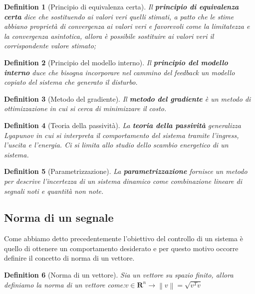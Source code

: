 \documentclass{book}
\newcommand{\norm}[1]{\left\lVert#1\right\rVert}
\newtheorem{definition}{Definition}[section]
\begin{document}
\begin{definition}[Principio di equivalenza certa]
Il \textbf{principio di equivalenza certa} dice che sostituendo ai valori veri quelli stimati, a patto che le stime abbiano proprietà di convergenza ai valori veri e favorevoli come la limitatezza e la convergenza asintotica, allora è possibile sostituire ai valori veri il corrispondente valore stimato;
\end{definition}
\begin{definition}[Principio del modello interno]
Il \textbf{principio del modello interno} duce che bisogna incorporare nel cammino del feedback un modello copiato del sistema che generato il disturbo.
\end{definition}
\begin{definition}[Metodo del gradiente]
Il \textbf{metodo del gradiente} è un metodo di ottimizzazione in cui si cerca di minimizzare il costo.
\end{definition}
\begin{definition}[Teoria della passività]
La \textbf{teoria della passività} generalizza \emph{Lyapunov} in cui si interpreta il comportamento del sistema tramite l'ingress, l'uscita e l'energia. Ci si limita allo studio dello scambio energetico di un sistema.
\end{definition}
\begin{definition}[Parametrizzazione]
La \textbf{parametrizzazione} fornisce un metodo per descrive l'incertezza di un sistema dinamico come combinazione lineare di segnali noti e quantità non note.
\end{definition}
\subsection{Norma di un segnale}
Come abbiamo detto precedentemente l'obiettivo del controllo di un sistema è quello di ottenere un comportamento desiderato e per questo motivo occorre definire il concetto di norma di un vettore.
\begin{definition}[Norma di un vettore]
Sia un vettore su spazio finito, allora definiamo la norma di un vettore come:\newline\(v\in\mathbf{R}^{n}\rightarrow\norm{v}=\sqrt{v^T v}\)
\end{definition}
\end{document}
